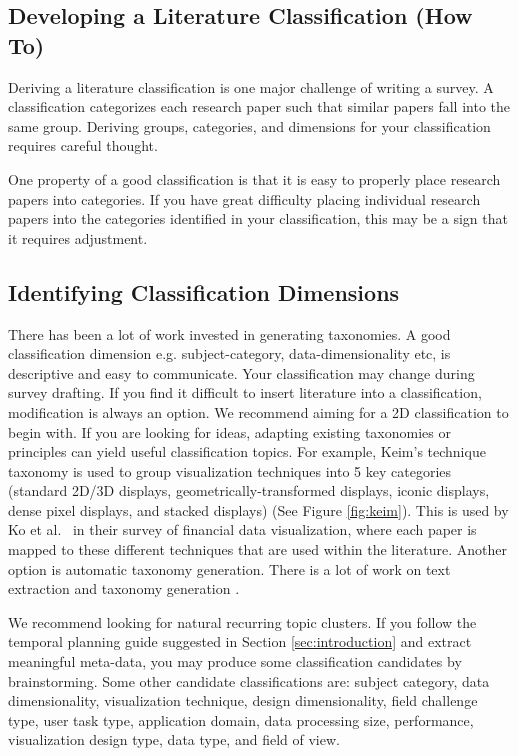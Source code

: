 \subsection{Developing a Literature Classification (How To) \cons } \label{sec:classification}
Deriving a literature classification is one major challenge of writing a survey. A classification categorizes each research paper such that similar papers fall into the same group. Deriving groups, categories, and dimensions for your classification requires careful thought.

One property of a good classification is that it is easy to properly place research papers into categories. If you have great difficulty placing individual research papers into the categories identified in your classification, this may be a sign that it requires adjustment.

\subsection{Identifying Classification Dimensions \cons } \label{sec:identify}
There has been a lot of work invested in generating taxonomies. A good classification dimension e.g. subject-category, data-dimensionality etc, is descriptive and easy to communicate. Your classification may change during survey drafting. If you find it difficult to insert literature into a classification, modification is always an option. We recommend aiming for a 2D classification to begin with.
If you are looking for ideas, adapting existing taxonomies or principles can yield useful classification topics. For example, Keim's technique taxonomy \cite{keim2002information} is used to group visualization techniques into 5 key categories (standard 2D/3D displays, geometrically-transformed displays, iconic displays, dense pixel displays, and stacked displays) (See Figure \ref{fig:keim}). This is used by Ko et al.\ \cite{ko2016survey} in their survey of financial data visualization, where each paper is mapped to these different techniques that are used within the literature. Another option is automatic taxonomy generation. There is a lot of work on text extraction \cite{dias2000combining,park2002automatic} and taxonomy generation \cite{bakar2009building, tsui2010concept, ottens2007multi, velardi2007taxonomy, murthy2010automatically, carrion2018designing}.

We recommend looking for natural recurring topic clusters. If you follow the temporal planning guide suggested in Section \ref{sec:introduction} and extract meaningful meta-data, you may produce some classification candidates by brainstorming. Some other candidate classifications are: subject category, data dimensionality, visualization technique, design dimensionality, field challenge type, user task type, application domain, data processing size, performance, visualization design type, data type, and field of view.

